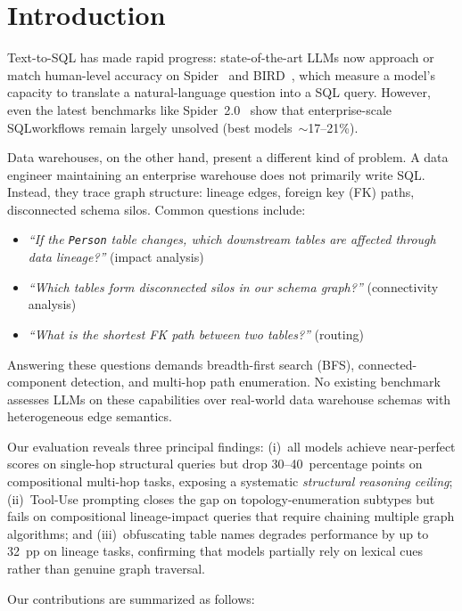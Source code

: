 \section{Introduction}

Text-to-SQL has made rapid progress: state-of-the-art LLMs now approach or
match human-level accuracy on Spider~\cite{yu2018spider} and
BIRD~\cite{li2023bird}, which measure a model's capacity to translate a
natural-language question into a SQL query.  However, even the latest
benchmarks like Spider~2.0~\cite{lei2024spider2} show that enterprise-scale
SQLworkflows remain largely unsolved (best models~$\sim$17--21\%).

Data warehouses, on the other hand, present a different kind of problem.
A data engineer maintaining an enterprise warehouse does not primarily write
SQL.  Instead, they trace graph structure: lineage edges, foreign key (FK) paths,
disconnected schema silos.  Common questions include:

\begin{itemize}
  \item \emph{``If the \texttt{Person} table changes, which downstream tables
    are affected through data lineage?''} (impact analysis)
  \item \emph{``Which tables form disconnected silos in our schema graph?''}
    (connectivity analysis)
  \item \emph{``What is the shortest FK path between two tables?''}
    (routing)
\end{itemize}

Answering these questions demands breadth-first search (BFS), connected-component detection, and
multi-hop path enumeration.  No existing benchmark assesses LLMs on these capabilities
over real-world data warehouse schemas with heterogeneous
edge semantics.

Our evaluation reveals three principal findings:
(i)~all models achieve near-perfect scores on single-hop
structural queries but drop 30--40~percentage points on
compositional multi-hop tasks, exposing a systematic
\emph{structural reasoning ceiling};
(ii)~Tool-Use prompting closes the gap on topology-enumeration
subtypes but fails on compositional lineage-impact queries
that require chaining multiple graph algorithms; and
(iii)~obfuscating table names degrades performance by up to
32~pp on lineage tasks, confirming that models partially
rely on lexical cues rather than genuine graph traversal.

Our contributions are summarized as follows:

